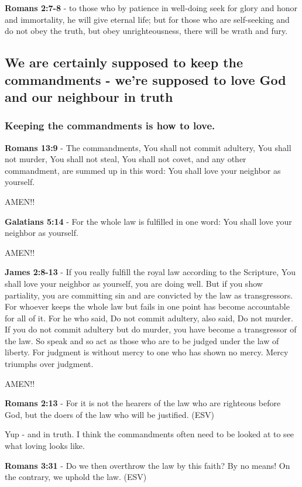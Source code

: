 \documentclass[11pt]{article}
\begin{document}
\textbf{Romans 2:7-8} - to those who by patience in well-doing seek for glory and honor and immortality, he will give eternal life; but for those who are self-seeking and do not obey the truth, but obey unrighteousness, there will be wrath and fury.

\subsection{We are certainly supposed to keep the commandments - we're supposed to love God and our neighbour in truth}
\label{sec:orgd35f730}
\subsubsection{Keeping the commandments is how to love.}
\label{sec:org8b332ae}

\textbf{Romans 13:9} - The commandments, You shall not commit adultery, You shall not murder, You shall not steal, You shall not covet, and any other commandment, are summed up in this word: You shall love your neighbor as yourself.

AMEN!!

\textbf{Galatians 5:14} - For the whole law is fulfilled in one word: You shall love your neighbor as yourself.

AMEN!!

\textbf{James 2:8-13} - If you really fulfill the royal law according to the Scripture, You shall love your neighbor as yourself, you are doing well. But if you show partiality, you are committing sin and are convicted by the law as transgressors. For whoever keeps the whole law but fails in one point has become accountable for all of it. For he who said, Do not commit adultery, also said, Do not murder. If you do not commit adultery but do murder, you have become a transgressor of the law. So speak and so act as those who are to be judged under the law of liberty. For judgment is without mercy to one who has shown no mercy. Mercy triumphs over judgment.

AMEN!!

\textbf{Romans 2:13} - For it is not the hearers of the law who are righteous before God, but the doers of the law who will be justified. (ESV)

Yup - and in truth. I think the commandments often need to be looked at to see what loving looks like.

\textbf{Romans 3:31} - Do we then overthrow the law by this faith? By no means! On the contrary, we uphold the law. (ESV)
\end{document}
